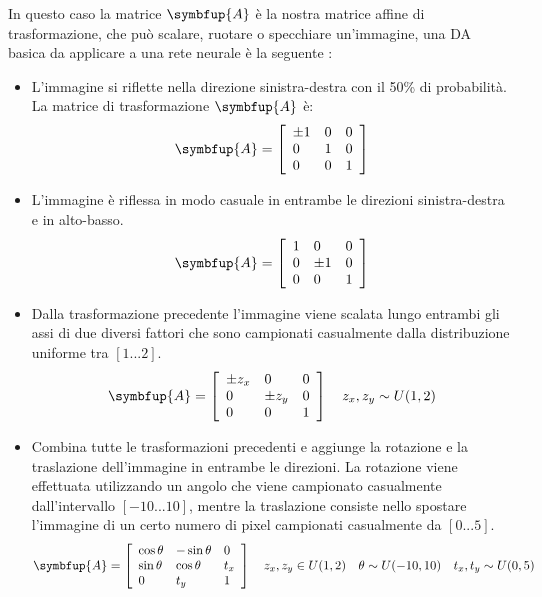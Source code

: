 In questo caso la matrice \(\symbfup{A}\) è la nostra matrice affine di trasformazione, che può scalare, ruotare o specchiare un'immagine, una DA basica da applicare a una rete neurale è la seguente \cite{nanni_dct_pca} \cite{gonzalez_dip}:
\begin{itemize}
    \item L'immagine si riflette nella direzione sinistra-destra con il 50\% di probabilità. La matrice di trasformazione \(\symbfup{A}\) è:
    \[\symbfup{A} = \left[\begin{array}{lll}\pm 1 & 0 & 0 \\ 0 & 1 & 0 \\ 0 & 0 & 1\end{array}\right]\]
    \item L'immagine è riflessa in modo casuale in entrambe le direzioni sinistra-destra e in alto-basso.
    \[\symbfup{A} = \left[\begin{array}{lll}1 & 0 & 0 \\ 0 & \pm 1 & 0 \\ 0 & 0 & 1\end{array}\right]\]
    \item Dalla trasformazione precedente l'immagine viene scalata lungo entrambi gli assi di due diversi fattori che sono
    campionati casualmente dalla distribuzione uniforme tra \([1...2]\).
    \[\symbfup{A} = \left[\begin{array}{lll}\pm z_x & 0 & 0 \\ 0 & \pm z_y & 0 \\ 0 & 0 & 1\end{array}\right] \quad z_x, z_y \sim U(1,2)\]
    \item Combina tutte le trasformazioni precedenti  e aggiunge la rotazione e la traslazione dell'immagine in entrambe le
    direzioni. La rotazione viene effettuata utilizzando un angolo che viene campionato casualmente dall'intervallo
    \([-10...10]\), mentre la traslazione consiste nello spostare l'immagine di un certo numero di pixel
    campionati casualmente da \([0...5]\).
    \[\symbfup{A} = \left[ \begin{array} { lll } \cos \theta & - \sin \theta & 0 \\ \sin \theta & \cos \theta & t_x \\ 0 & t_y & 1 \end{array} \right] \quad z_x, z_y \in U(1,2) \quad \theta \sim U(-10,10) \quad t_x, t_y \sim U(0,5)\]
\end{itemize}

